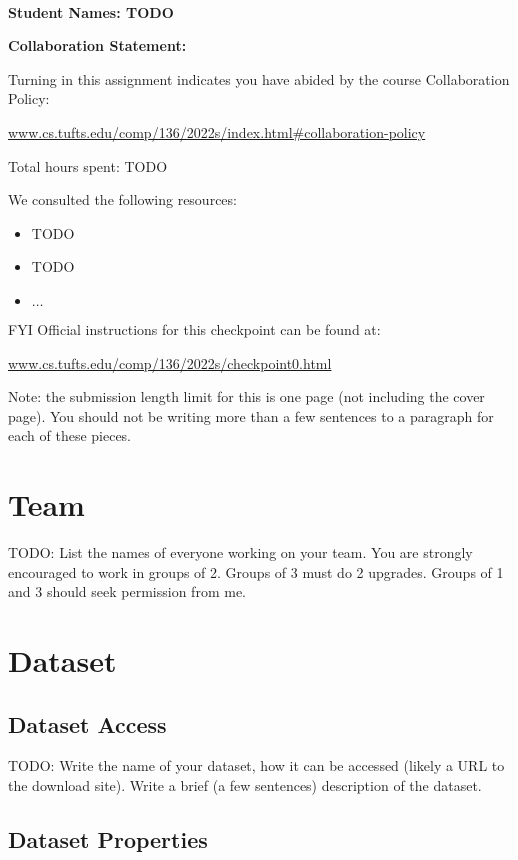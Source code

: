 \documentclass[12pt]{article}
\begin{document}
~~\\ %

{\Large{\bf Student Names: TODO}}


{\Large{\bf Collaboration Statement:}}

Turning in this assignment indicates you have abided by the course Collaboration Policy:

\url{www.cs.tufts.edu/comp/136/2022s/index.html#collaboration-policy}

Total hours spent: TODO

We consulted the following resources:
\begin{itemize}
\item TODO
\item TODO
\item $\ldots$	
\end{itemize}

FYI Official instructions for this checkpoint can be found at:

\url{www.cs.tufts.edu/comp/136/2022s/checkpoint0.html}


\newpage

Note: the submission length limit for this is one page (not including the cover page).  You should not be writing more than a few sentences to a paragraph for each of these pieces.

\section{Team}

TODO: List the names of everyone working on your team.  You are strongly encouraged to work in groups of 2.  Groups of 3 must do 2 upgrades.  Groups of 1 and 3 should seek permission from me.  

\section{Dataset}

\subsection{Dataset Access}

TODO: Write the name of your dataset, how it can be accessed (likely a URL to the download site).  Write a brief (a few sentences) description of the dataset.

\subsection{Dataset Properties}
\end{document}
